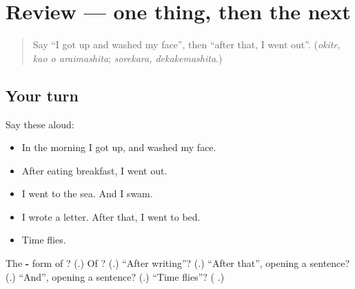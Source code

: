 \section[(review)]{Review — one thing, then the next}

\label{lesson:JA-R252-one-thing-then-the-next}



\begin{quote}
Say \textquotedblleft{}I got up and washed my face\textquotedblright{}, then \textquotedblleft{}after that, I went out\textquotedblright{}. (\emph{okite, kao o araimashita}; \emph{sorekara, dekakemashita}.)
\end{quote}

\subsection*{Your turn}
Say these aloud:

\begin{itemize}
\raggedright
  \item In the morning I got up, and washed my face.
  \item After eating breakfast, I went out.
  \item I went to the sea. And I swam.
  \item I wrote a letter. After that, I went to bed.
  \item Time flies.
\end{itemize}

\begin{tcolorbox}[breakable,colback=teal!4,colframe=teal!35!black,title={Before you move on}]
The \textbf{-} form of \textbf{}? (\textbf{}.) Of \textbf{}? (\textbf{}.) \textquotedblleft{}After writing\textquotedblright{}? (\textbf{}.) \textquotedblleft{}After that\textquotedblright{}, opening a sentence? (\textbf{}.) \textquotedblleft{}And\textquotedblright{}, opening a sentence? (\textbf{}.) \textquotedblleft{}Time flies\textquotedblright{}? (\textbf{ }.)
\end{tcolorbox}
